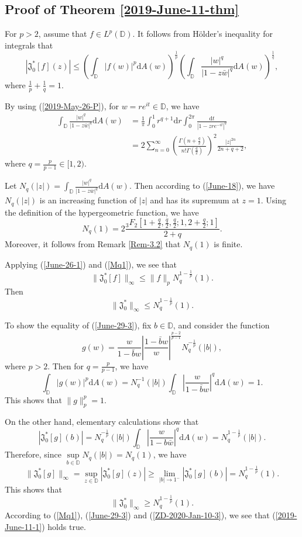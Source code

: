 \documentclass[a4paper,12pt]{amsart}
\theoremstyle{definition}
\numberwithin{equation}{section}
\newcommand{\ID}{{\mathbb D}}
\def\be{\begin{equation}}
\def\ee{\end{equation}}
\begin{document}
\subsection*{Proof of Theorem \ref{2019-June-11-thm}}
For $p>2$, assume that $f\in L^p(\ID)$. It follows from H\"older's inequality for integrals that
\be\label{June-26-1}|\mathfrak{J}_0^*[f](z)|\leq\left(\int_{\ID}|f(w)|^p\mathrm{d}A(w) \right)^{\frac{1}{p}}\left(\int_{\ID}\frac{|w|^q}{|1-z\bar{w}|^q}\mathrm{d}A(w) \right)^{\frac{1}{q}},\ee
where $\frac{1}{p}+\frac{1}{q}=1$.

By using (\ref{2019-May-26-P}), for $w=re^{it}\in\ID$, we have
\begin{align}\label{June-18}
\int_{\ID}\frac{|w|^q}{|1-z\bar{w}|^q}\mathrm{d}A(w) &=\frac{1}{\pi}\int_0^1r^{q+1}\mathrm{d}r\int_0^{2\pi}\frac{\mathrm{d}t}{|1-zre^{-it}|^q}\\ \nonumber
&= 2\sum\limits_{n=0}^{\infty}\left(\frac{\Gamma(n+\frac{q}{2})}{n!\Gamma(\frac{q}{2})}\right)^2\frac{|z|^{2n}}{2n+q+2},
\end{align}
where $q=\frac{p}{p-1}\in[1, 2)$.

Let $N_q(|z|)=\int_{\ID}\frac{|w|^q}{|1-z\bar{w}|^q}\mathrm{d}A(w) $. Then according to (\ref{June-18}), we have $N_q(|z|)$ is an increasing function of $|z|$ and has its supremum at $z=1$.
Using the definition of the hypergeometric function, we have
\be\label{Mq1}N_q(1)=2\frac{{}_3F_2[1+\frac{q}{2}, \frac{q}{2},\frac{q}{2}; 1, 2+\frac{q}{2}; 1 ]}{2+q}.\ee
Moreover, it follows from Remark \ref{Rem-3.2} that $N_q(1)$ is finite.

Applying (\ref{June-26-1}) and (\ref{Mq1}), we see that
$$\|\mathfrak{J}_0^*[f]\|_{\infty}\leq \|f\|_{p}N_q^{1-\frac{1}{p}}(1).$$
Then
\be\label{June-29-3}
\|\mathfrak{J}_0^*\|_{\infty}\leq N_q^{1-\frac{1}{p}}(1).
\ee


To show the equality of (\ref{June-29-3}), fix $b\in\ID$, and consider the function
$$g(w)=\frac{w}{1-\bar{b}w}\left|\frac{1-\bar{b}w}{w}\right|^{\frac{p-2}{p-1}}N_q^{-\frac{1}{p}}(|b|),$$
where $p>2$.
Then for $q=\frac{p}{p-1}$, we have
$$\int_{\ID}|g(w)|^p\mathrm{d}A(w) =N_q^{-1}(|b|)\int_{\ID}\left|\frac{w}{1-\bar{b}w}\right|^q\mathrm{d}A(w) =1.$$
This shows that $\|g\|_p^p=1$.

On the other hand, elementary calculations show that
$$|\mathfrak{J}_0^*[g](b)|=N_q^{-\frac{1}{p}}(|b|)\int_{\ID}\left|\frac{w}{1-b\bar{w}}\right|^q\mathrm{d}A(w) =N_q^{1-\frac{1}{p}}(|b|).$$
Therefore, since $\sup\limits_{b\in\ID}N_q(|b|)=N_q(1)$, we have
$$\|\mathfrak{J}_0^*[g]\|_{\infty}=\sup\limits_{z\in\ID}|\mathfrak{J}_0^*[g](z)|\geq \lim\limits_{|b|\rightarrow1^-}|\mathfrak{J}_0^*[g](b)|= N_q^{1-\frac{1}{p}}(1).$$
This shows that
\be\label{ZD-2020-Jan-10-3}
\|\mathfrak{J}_0^*\|_{\infty}\geq N_q^{1-\frac{1}{p}}(1).
\ee
According to (\ref{Mq1}), (\ref{June-29-3}) and (\ref{ZD-2020-Jan-10-3}), we see that
(\ref{2019-June-11-1}) holds true.
\end{document}
